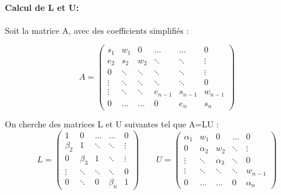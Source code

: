 \documentclass{article}
\begin{document}
\paragraph{Calcul de L et U:}
Soit la matrice A, avec des coefficients simplifi\'{e}s :

\[A=\begin{pmatrix}
   s_1 & w_1 & 0 & \ldots & \ldots & 0 \\
   e_2 & s_2 & w_2 & \ddots & \ddots & \vdots \\
   0 & \ddots & \ddots & \ddots & \ddots & \vdots \\
   \vdots & \ddots & \ddots & \ddots & \ddots & 0 \\
   \vdots & \ddots & \ddots & e_{n-1} & s_{n-1} & w_{n-1} \\
   0 & \ldots & \ldots & 0 & e_n & s_n
\end{pmatrix}\]

\newpage
\begingroup\raggedleft
On cherche des matrices L et U suivantes tel que A=LU :
\endgroup
\[L=\begin{pmatrix}
   1 & 0 & \ldots & \ldots & 0 \\
   \beta_2 & 1 & \ddots & \ddots & \vdots \\
   0 & \beta_3 & 1 & \ddots & \vdots \\ 
   \vdots & \ddots & \ddots & \ddots & 0\\
   0 & \ddots & 0 & \beta_n & 1
\end{pmatrix}
\qquad
U=\begin{pmatrix}
   \alpha_1 & w_1 & 0 & \ldots & 0 \\
   0 & \alpha_2 & w_2 & \ddots & \vdots \\
   \vdots & \ddots & \alpha_3 & \ddots & 0 \\
   \vdots & \ddots & \ddots & \ddots & w_{n-1} \\
   0 & \ldots & \ldots & 0 & \alpha_n
\end{pmatrix}\]
\end{document}
